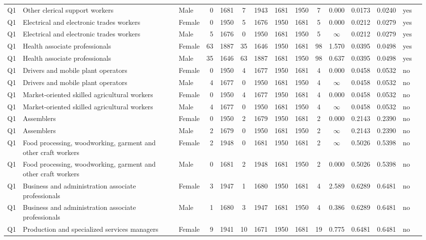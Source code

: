 \begin{longtable}{lllrcccccccccll}
Q1 & Other clerical support workers & Male & 0 & 1681 & 7 & 1943 & 1681 & 1950 & 7 & 0.000 & 0.0173 & 0.0240 & yes \\
Q1 & Electrical and electronic trades workers & Female & 0 & 1950 & 5 & 1676 & 1950 & 1681 & 5 & 0.000 & 0.0212 & 0.0279 & yes \\
Q1 & Electrical and electronic trades workers & Male & 5 & 1676 & 0 & 1950 & 1681 & 1950 & 5 & $\infty$ & 0.0212 & 0.0279 & yes \\
Q1 & Health associate professionals & Female & 63 & 1887 & 35 & 1646 & 1950 & 1681 & 98 & 1.570 & 0.0395 & 0.0498 & yes \\
Q1 & Health associate professionals & Male & 35 & 1646 & 63 & 1887 & 1681 & 1950 & 98 & 0.637 & 0.0395 & 0.0498 & yes \\
Q1 & Drivers and mobile plant operators & Female & 0 & 1950 & 4 & 1677 & 1950 & 1681 & 4 & 0.000 & 0.0458 & 0.0532 & no \\
Q1 & Drivers and mobile plant operators & Male & 4 & 1677 & 0 & 1950 & 1681 & 1950 & 4 & $\infty$ & 0.0458 & 0.0532 & no \\
Q1 & Market-oriented skilled agricultural workers & Female & 0 & 1950 & 4 & 1677 & 1950 & 1681 & 4 & 0.000 & 0.0458 & 0.0532 & no \\
Q1 & Market-oriented skilled agricultural workers & Male & 4 & 1677 & 0 & 1950 & 1681 & 1950 & 4 & $\infty$ & 0.0458 & 0.0532 & no \\
Q1 & Assemblers & Female & 0 & 1950 & 2 & 1679 & 1950 & 1681 & 2 & 0.000 & 0.2143 & 0.2390 & no \\
Q1 & Assemblers & Male & 2 & 1679 & 0 & 1950 & 1681 & 1950 & 2 & $\infty$ & 0.2143 & 0.2390 & no \\
Q1 & Food processing, woodworking, garment and other craft workers & Female & 2 & 1948 & 0 & 1681 & 1950 & 1681 & 2 & $\infty$ & 0.5026 & 0.5398 & no \\
Q1 & Food processing, woodworking, garment and other craft workers & Male & 0 & 1681 & 2 & 1948 & 1681 & 1950 & 2 & 0.000 & 0.5026 & 0.5398 & no \\
Q1 & Business and administration associate professionals & Female & 3 & 1947 & 1 & 1680 & 1950 & 1681 & 4 & 2.589 & 0.6289 & 0.6481 & no \\
Q1 & Business and administration associate professionals & Male & 1 & 1680 & 3 & 1947 & 1681 & 1950 & 4 & 0.386 & 0.6289 & 0.6481 & no \\
Q1 & Production and specialized services managers & Female & 9 & 1941 & 10 & 1671 & 1950 & 1681 & 19 & 0.775 & 0.6481 & 0.6481 & no \\

\end{longtable}
